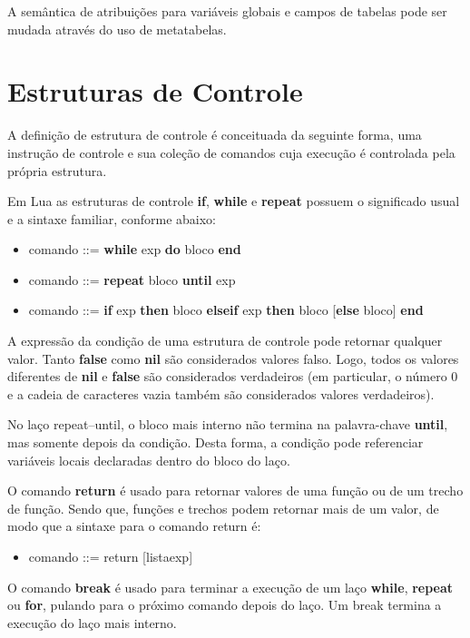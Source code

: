 \documentclass[
12pt, %
openright, %
oneside, %
a4paper, %
english, %
brazil, %
]{abntex2}
\begin{document}
A semântica de atribuições para variáveis globais e campos de tabelas pode ser mudada através do uso de metatabelas.

\chapter{Estruturas de Controle}
A definição de estrutura de controle é conceituada da seguinte forma, uma instrução de controle e sua coleção de comandos cuja execução é controlada pela própria estrutura.

Em Lua as estruturas de controle \textbf{if}, \textbf{while} e \textbf{repeat} possuem o significado usual e a sintaxe familiar, conforme abaixo:

\begin{itemize}
\item comando ::= \textbf{while} exp \textbf{do} bloco \textbf{end}
\item comando ::= \textbf{repeat} bloco \textbf{until} exp
\item comando ::= \textbf{if} exp \textbf{then} bloco {\textbf{elseif} exp \textbf{then} bloco} [\textbf{else} bloco] \textbf{end}
\end{itemize}

A expressão da condição de uma estrutura de controle pode retornar qualquer valor. Tanto \textbf{false} como \textbf{nil} são considerados valores falso. Logo, todos os valores diferentes de \textbf{nil} e \textbf{false} são considerados verdadeiros (em particular, o número 0 e a cadeia de caracteres vazia também são considerados valores verdadeiros).

No laço repeat–until, o bloco mais interno não termina na palavra-chave \textbf{until}, mas somente depois da condição. Desta forma, a condição pode referenciar variáveis locais declaradas dentro do bloco do laço.

O comando \textbf{return} é usado para retornar valores de uma função ou de um trecho de função. Sendo que, funções e trechos podem retornar mais de um valor, de modo que a sintaxe para o comando return é:

\begin{itemize}
\item comando ::= return [listaexp]
\end{itemize}

O comando \textbf{break} é usado para terminar a execução de um laço \textbf{while}, \textbf{repeat} ou \textbf{for}, pulando para o próximo comando depois do laço. Um break termina a execução do laço mais interno.
\end{document}
